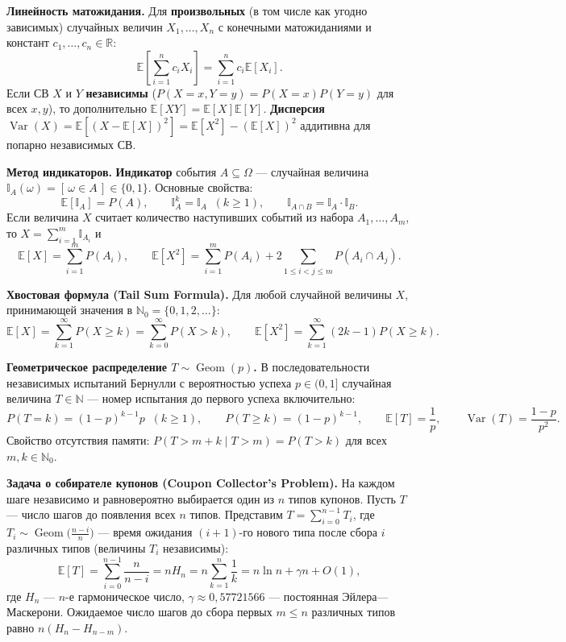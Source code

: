 \documentclass[10pt,a4paper]{article}
\renewcommand{\le}{\leqslant}
\renewcommand{\ge}{\geqslant}
\newcommand{\N}{\mathbb{N}}
\newcommand{\R}{\mathbb{R}}
\newcommand{\E}{\mathbb{E}}
\newcommand{\Var}{\operatorname{Var}}
\newcommand{\Ind}{\mathbb{I}}
\newcommand{\iverson}[1]{[\,#1\,]}
\DeclareMathOperator{\Geom}{Geom}
\begin{document}
\textbf{Линейность матожидания.} Для \textbf{произвольных} (в том числе как угодно зависимых) случайных величин $X_1, \dots, X_n$ с конечными матожиданиями и констант $c_1, \dots, c_n \in \R$:
\[
  \E\!\left[\sum_{i=1}^{n} c_i X_i\right] = \sum_{i=1}^{n} c_i \E[X_i].
\]
Если СВ $X$ и $Y$ \textbf{независимы} ($P(X = x, Y = y) = P(X = x)P(Y = y)$ для всех $x, y$), то дополнительно $\E[XY] = \E[X]\E[Y]$. \textbf{Дисперсия} $\Var(X) = \E[(X - \E[X])^2] = \E[X^2] - (\E[X])^2$ аддитивна для попарно независимых СВ.

\textbf{Метод индикаторов.} \textbf{Индикатор} события $A \subseteq \Omega$ — случайная величина $\Ind_A(\omega) = \iverson{\omega \in A} \in \{0, 1\}$. Основные свойства:
\[
  \E[\Ind_A] = P(A), \qquad \Ind_A^k = \Ind_A \;\;(k \ge 1), \qquad \Ind_{A \cap B} = \Ind_A \cdot \Ind_B.
\]
Если величина $X$ считает количество наступивших событий из набора $A_1, \dots, A_m$, то $X = \sum_{i=1}^m \Ind_{A_i}$ и
\[
  \E[X] = \sum_{i=1}^{m} P(A_i), \qquad
  \E[X^2] = \sum_{i=1}^{m} P(A_i) + 2 \sum_{1 \le i < j \le m} P(A_i \cap A_j).
\]

\textbf{Хвостовая формула (Tail Sum Formula).} Для любой случайной величины $X$, принимающей значения в $\N_0 = \{0, 1, 2, \dots\}$:
\[
  \E[X] = \sum_{k=1}^{\infty} P(X \ge k) = \sum_{k=0}^{\infty} P(X > k), \qquad
  \E[X^2] = \sum_{k=1}^{\infty} (2k - 1) P(X \ge k).
\]

\textbf{Геометрическое распределение $T \sim \Geom(p)$.} В последовательности независимых испытаний Бернулли с вероятностью успеха $p \in (0, 1]$ случайная величина $T \in \N$ — номер испытания до первого успеха включительно:
\[
  P(T = k) = (1 - p)^{k-1} p \;\;(k \ge 1), \qquad P(T \ge k) = (1 - p)^{k-1}, \qquad
  \E[T] = \frac{1}{p}, \qquad \Var(T) = \frac{1 - p}{p^2}.
\]
Свойство отсутствия памяти: $P(T > m + k \mid T > m) = P(T > k)$ для всех $m, k \in \N_0$.

\textbf{Задача о собирателе купонов (Coupon Collector's Problem).} На каждом шаге независимо и равновероятно выбирается один из $n$ типов купонов. Пусть $T$ — число шагов до появления всех $n$ типов. Представим $T = \sum_{i=0}^{n-1} T_i$, где $T_i \sim \Geom\bigl(\frac{n - i}{n}\bigr)$ — время ожидания $(i + 1)$-го нового типа после сбора $i$ различных типов (величины $T_i$ независимы):
\[
  \E[T] = \sum_{i=0}^{n-1} \frac{n}{n - i} = n H_n = n \sum_{k=1}^{n} \frac{1}{k} = n \ln n + \gamma n + O(1),
\]
где $H_n$ — $n$-е гармоническое число, $\gamma \approx 0{,}57721566$ — постоянная Эйлера—Маскерони. Ожидаемое число шагов до сбора первых $m \le n$ различных типов равно $n(H_n - H_{n-m})$.
\end{document}
